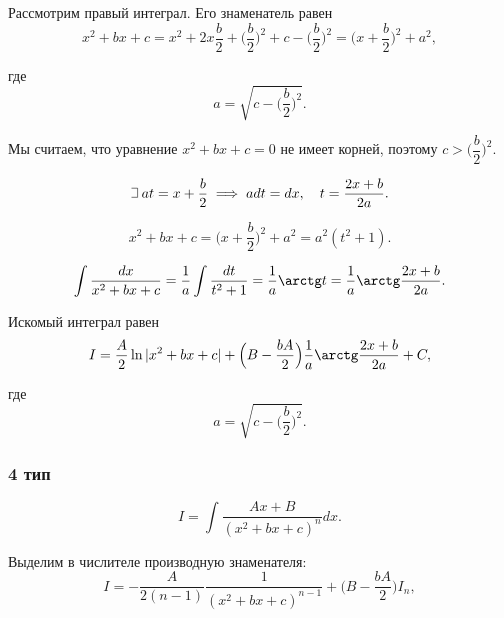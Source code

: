 \documentclass[a4paper,12pt,oneside]{extbook}
\def\lets{%
    \mathord{\setbox0=\hbox{$\exists$}%
        \hbox{\kern 0.125\wd0%
            \vbox to \ht0{%
                \hrule width 0.75\wd0%
                \vfill%
                \hrule width 0.75\wd0}%
            \vrule height \ht0%
            \kern 0.125\wd0}%
    }%
    \hspace{2pt}
}
\theoremstyle{numbered}
\theoremstyle{unnumbered}
\theoremstyle{named}
\theoremstyle{unnumbered}
\theoremstyle{named}
\theoremstyle{named}
\theoremstyle{named}
\begin{document}
Рассмотрим правый интеграл. Его знаменатель равен
\begin{equation}
    x^2 + bx + c =
    x^2 + 2x \frac{b}{2} + \Big( \frac{b}{2} \Big)^2 + c - \Big( \frac{b}{2} \Big)^2 =
    \Big( x + \frac{b}{2} \Big)^2 +a^2,
\end{equation}

где
\begin{equation}
    a = \sqrt{c - \Big( \frac{b}{2} \Big)^2}.
\end{equation}

Мы считаем, что уравнение \(x^2 + bx + c = 0\) не имеет корней, поэтому \(c > \Big( \dfrac{b}{2} \Big)^2\).

\begin{equation}
    \lets at = x + \frac{b}{2} \implies adt = dx,
    \quad
    t = \frac{2x + b}{2a}.
\end{equation}

\begin{equation}
    x^2 + bx + c = \Big( x + \frac{b}{2} \Big)^2 + a^2 = a^2 (t^2 + 1).
\end{equation}

\begin{equation}
    \int \frac{dx}{x^2 + bx + c} =
    \frac{1}{a} \int \frac{dt}{t^2 + 1} =
    \frac{1}{a} \arctg t =
    \frac{1}{a} \arctg \frac{2x + b}{2a}.
\end{equation}

Искомый интеграл равен
\begin{equation}
    I = \frac{A}{2} \ln |x^2 + bx + c| + \Big( B - \frac{bA}{2} \Big) \frac{1}{a} \arctg \frac{2x + b}{2a} + C,
\end{equation}

где
\begin{equation}
    a = \sqrt{c - \Big( \frac{b}{2} \Big)^2}.
\end{equation}

\subsubsection{4 тип}%
\label{ssub:4 тип}

\begin{equation}
    I = \int \frac{Ax+ B}{(x^2 + bx + c)^n}dx.
\end{equation}

Выделим в числителе производную знаменателя:
\begin{equation}
    I = - \frac{A}{2(n - 1)} \frac{1}{(x^2 + bx + c)^{n - 1}} + \Big( B - \frac{bA}{2} \Big) I_n,
\end{equation}
\end{document}
